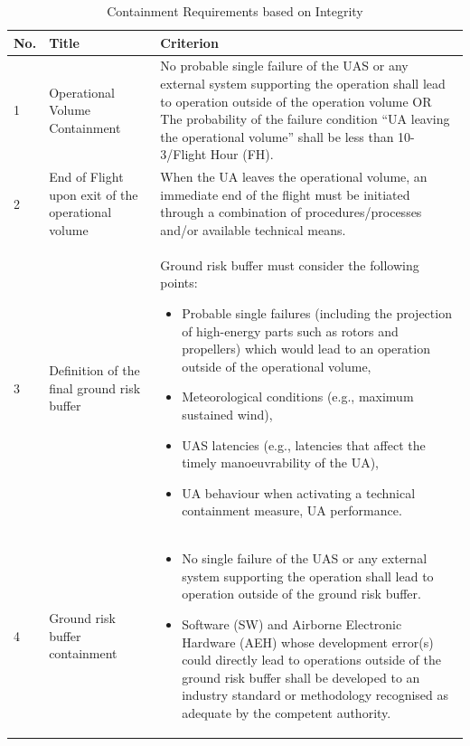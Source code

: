 \begin{table}[H]
    \centering
        \caption{Containment Requirements based on Integrity \cite{Jarus_Annex_E}}
    \begin{tabular}{|p{0.5cm}|p{4cm}|p{10.5cm}|}
    \hline
         \textbf{No.} & \textbf{Title} &  \textbf{Criterion} \\ \hline\hline
         1 & Operational Volume Containment & No probable single failure of the UAS or any external system supporting the operation shall lead to operation outside of the operation volume OR The probability of the failure condition “UA leaving the operational volume” shall be less than 10-3/Flight Hour (FH). \\ \hline
         2 & End of Flight upon exit of the operational volume & When the UA leaves the operational volume, an immediate end of the flight must be initiated through a combination of procedures/processes and/or available technical means. \\ \hline
         3 & Definition of the final ground risk buffer & Ground risk buffer must consider the following points: 
         \begin{itemize}
         \item Probable single failures (including the projection of high-energy parts such as rotors and propellers) which would lead to an operation outside of the operational volume,
         \item Meteorological conditions (e.g., maximum sustained wind),
         \item UAS latencies (e.g., latencies that affect the timely manoeuvrability of the UA),
         \item UA behaviour when activating a technical containment measure, UA performance.
         \end{itemize}
         \\ \hline
         4 & Ground risk buffer containment &
         \begin{itemize}
         \item No single failure of the UAS or any external system supporting the operation shall lead to operation outside of the ground risk buffer.
         \item Software (SW) and Airborne Electronic Hardware (AEH) whose development error(s) could directly lead to operations outside of the ground risk buffer shall be developed to an industry standard or methodology recognised as adequate by the competent authority.
         \end{itemize}
         \\ \hline
         
    \end{tabular}

    \label{tab:containment_requirements_integrity}
\end{table}

